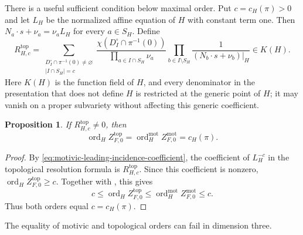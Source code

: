 \documentclass[12pt]{amsart}
\numberwithin{equation}{section}
\theoremstyle{plain}
\newtheorem{proposition}[theorem]{Proposition}
\theoremstyle{definition}
\theoremstyle{remark}
\theoremstyle{definition}
\DeclareMathOperator{\ord}{ord}
\begin{document}
There is a useful sufficient condition below maximal order. Put $c=c_H(\pi)>0$ and let $L_H$ be the normalized affine equation of $H$ with constant term one. Then $N_a\cdot s+\nu_a=\nu_aL_H$ for every $a\in S_H$. Define
\begin{equation}\label{eq:motivic-leading-incidence-coefficient}
 R^{\mathrm{top}}_{H,c}=\sum_{\substack{D_I^\circ\cap\pi^{-1}(0)\ne\varnothing\\|I\cap S_H|=c}}\frac{\chi(D_I^\circ\cap\pi^{-1}(0))}{\prod_{a\in I\cap S_H}\nu_a}\prod_{b\in I\setminus S_H}\frac1{(N_b\cdot s+\nu_b)|_H}\in K(H).
\end{equation}
Here $K(H)$ is the function field of $H$, and every denominator in the presentation that does not define $H$ is restricted at the generic point of $H$; it may vanish on a proper subvariety without affecting this generic coefficient.


\begin{proposition}\label{prop:motivic-leading-incidence}
If $R^{\mathrm{top}}_{H,c}\ne0$, then
\begin{equation*}
\ord_HZ^{\mathrm{top}}_{F,0}=\ord_H^{\mathrm{mot}}Z^{\mathrm{mot}}_{F,0}=c_H(\pi).
\end{equation*}
\end{proposition}

\begin{proof}
By \eqref{eq:motivic-leading-incidence-coefficient}, the coefficient of $L_H^{-c}$ in the topological resolution formula is $R^{\mathrm{top}}_{H,c}$. Since this coefficient is nonzero, $\ord_HZ^{\mathrm{top}}_{F,0}\geq c$. Together with , this gives
\[
c\leq\ord_HZ^{\mathrm{top}}_{F,0}
\leq\ord_H^{\mathrm{mot}}Z^{\mathrm{mot}}_{F,0}
\leq c.
\]
Thus both orders equal $c=c_H(\pi)$.
\end{proof}



The equality of motivic and topological orders can fail in dimension three.
\end{document}
